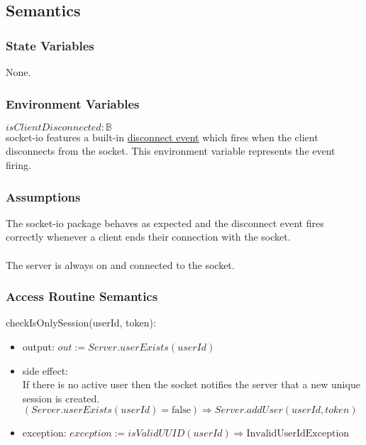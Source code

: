 \documentclass[12pt, titlepage]{article}
\begin{document}
\subsection{Semantics}

\subsubsection{State Variables}

None.

\subsubsection{Environment Variables}

$isClientDisconnected: \mathbb{B}$ \\
socket-io features a built-in \href{https://socket.io/docs/v4/client-socket-instance/#disconnect}{disconnect event} which fires when the client disconnects from the socket. This environment variable represents the event firing.  

\subsubsection{Assumptions}

The socket-io package behaves as expected and the disconnect event fires correctly whenever a client ends their connection with the socket. \\ \\
The server is always on and connected to the socket.

\subsubsection{Access Routine Semantics}

\noindent checkIsOnlySession(userId, token):
\begin{itemize}
\item output: $out := Server.userExists(userId)$
\item side effect: \\
If there is no active user then the socket notifies the server that a new unique session is created. \\
$(Server.userExists(userId) = \text{false}) \Rightarrow Server.addUser(userId, token)$ 

\item exception: $exception := isValidUUID(userId) \Rightarrow \text{InvalidUserIdException}$ 
\end{itemize}
\end{document}
